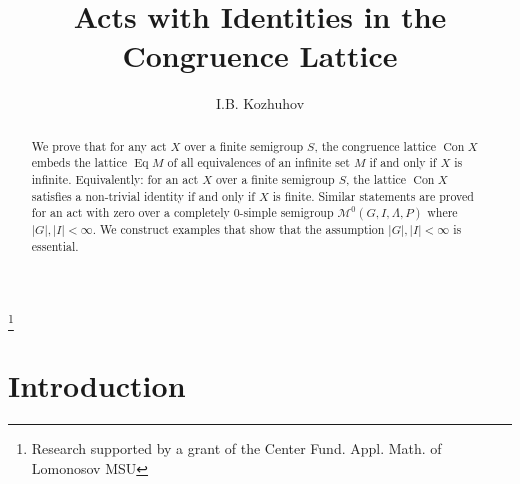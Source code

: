 \documentclass{birkau}
\numberwithin{equation}{section}
\theoremstyle{plain}
\theoremstyle{definition}
\DeclareMathOperator{\Con}{Con}
\DeclareMathOperator{\Eq}{Eq}
\begin{document}
	
    \title[Acts with Identities in the Congruence Lattice]{Acts with Identities in the Congruence Lattice}

    \author[I.B. Kozhuhov]{I.B. Kozhuhov}
    \address{National Research University MIET, \\
    Faculty of Mechanics and Mathematics of Lomonosov Moscow State University, \\
    Center of Fundamental and Applied Mathematics of Lomonosov MSU \\
    Moscow\\Russia}

    \address{Lomonosov Moscow State University\\Moscow\\Russia}

    \thanks{Research supported by a grant of the Center Fund. Appl. Math. of Lomonosov MSU}
	

    \begin{abstract}
    We prove that for any act $X$ over a finite semigroup $S$, the congruence lattice $\Con X$ embeds the lattice $\Eq M$ of all equivalences of an infinite set $M$ if and only if $X$ is infinite. Equivalently: for an act $X$ over a finite semigroup $S$, the lattice $\Con X$ satisfies a non-trivial identity if and only if $X$ is finite. Similar statements are proved for an act with zero over a completely 0-simple semigroup $\mathcal M^0(G,I,\Lambda,P)$ where $|G|,|I| <\infty$. We construct examples that show that the assumption $|G|,|I| <\infty$ is essential.
    \end{abstract}
	
	\maketitle
	
	\section{Introduction}
	
\end{document}
